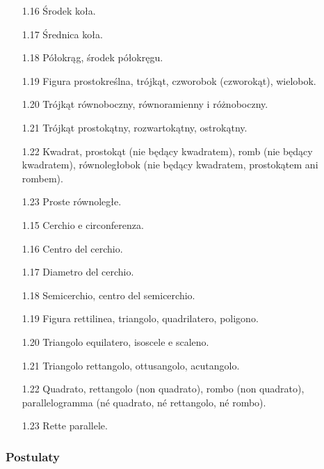 \begin{enumerate}
    \item [1.16] Środek koła. %
    \item [1.17] Średnica koła. %
    \item [1.18] Półokrąg, środek półokręgu. %
    \item [1.19] Figura prostokreślna, trójkąt, czworobok (czworokąt), wielobok. %
    \item [1.20] Trójkąt równoboczny, równoramienny i różnoboczny. %
    \item [1.21] Trójkąt prostokątny, rozwartokątny, ostrokątny. %
    \item [1.22] Kwadrat, prostokąt (nie będący kwadratem), romb (nie będący kwadratem), równoległobok (nie będący kwadratem, prostokątem ani rombem). %
    \item [1.23] Proste równoległe. %
    \item [1.15] Cerchio e circonferenza. %
    \item [1.16] Centro del cerchio. %
    \item [1.17] Diametro del cerchio. %
    \item [1.18] Semicerchio, centro del semicerchio. %
    \item [1.19] Figura rettilinea, triangolo, quadrilatero, poligono. %
    \item [1.20] Triangolo equilatero, isoscele e scaleno. %
    \item [1.21] Triangolo rettangolo, ottusangolo, acutangolo. %
    \item [1.22] Quadrato, rettangolo (non quadrato), rombo (non quadrato), parallelogramma (né quadrato, né rettangolo, né rombo). %
    \item [1.23] Rette parallele. %
\end{enumerate}

\subsubsection{Postulaty} %
